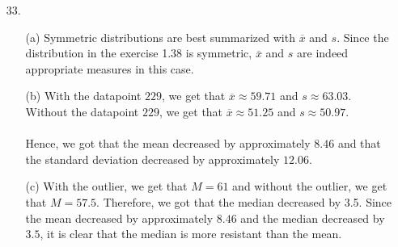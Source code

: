 \documentclass[11pt, a4paper]{article}
\begin{document}
\begin{itemize}
\item[]
\item[]

\item[33.]
\begin{itemize}
\item[(a)]
Symmetric distributions are best summarized with $\overline{x}$ and $s$.
Since the distribution in the exercise 1.38 is symmetric, $\overline{x}$
and $s$ are indeed appropriate measures in this case.

\item[]

\item[(b)]
With the datapoint $229$, we get that $\overline{x} \approx 59.71$ and $s \approx 63.03$.\\
Without the datapoint $229$, we get that $\overline{x} \approx 51.25$ and $s \approx 50.97$.\\\\
Hence, we got that the mean decreased by approximately $8.46$ and that the standard deviation
decreased by approximately $12.06$.

\item[]

\item[(c)]
With the outlier, we get that $M = 61$ and without the outlier, we get that $M = 57.5$.
Therefore, we got that the median decreased by 3.5. Since the mean decreased
by approximately $8.46$ and the median decreased by $3.5$, it is clear that
the median is more resistant than the mean.
\end{itemize}

\end{itemize}
\end{document}
